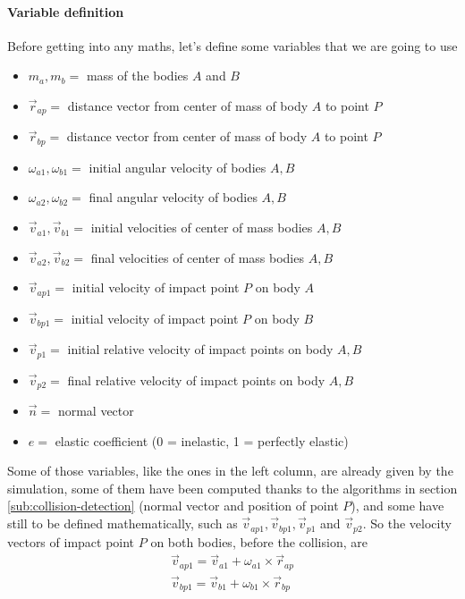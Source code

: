 \paragraph{Variable definition} Before getting into any maths, let's define some
variables that we are going to use

\begin{multicols}{2}
	\begin{itemize}
		\item $m_a, m_b = $ mass of the bodies $A$ and $B$
		\item $\vec r_{ap} = $ distance vector from center of mass of body $A$ to
		      point $P$
		\item $\vec r_{bp} = $ distance vector from center of mass of body $A$ to
		      point $P$
		\item $\omega_{a1}, \omega_{b1} = $ initial angular velocity of bodies
		      $A, B$
		\item $\omega_{a2}, \omega_{b2} = $ final angular velocity of bodies
		      $A, B$
		\item $\vec v_{a1}, \vec v_{b1} =$ initial velocities of center of mass
		      bodies $A, B$
		\item $\vec v_{a2}, \vec v_{b2} =$ final velocities of center of mass
		      bodies $A, B$
		\item $\vec v_{ap1}=$ initial velocity of impact point $P$ on body $A$
		\item $\vec v_{bp1}=$ initial velocity of impact point $P$ on body $B$
		\item $\vec v_{p1}=$ initial relative velocity of impact points on body $A, B$
		\item $\vec v_{p2}=$ final relative velocity of impact points on body $A, B$
		\item $\vec n=$ normal vector
		\item $ e=$ elastic coefficient (0 = inelastic, 1 = perfectly elastic)
	\end{itemize}
\end{multicols}

Some of those variables, like the ones in the left column, are already given by
the simulation, some of them have been computed thanks to the algorithms in
section \ref{sub:collision-detection} (normal vector and position of point $P$),
and some have still to be defined mathematically, such as $\vec v_{ap1},\vec
	v_{bp1},\vec v_{p1}$ and $\vec v_{p2}$. So the velocity vectors of impact
point $P$ on both bodies, before the collision, are
\begin{equation} \label{eq:vabp1}
	\begin{split}
		\vec v_{ap1} = \vec v_{a1} + \omega_{a1} \times \vec r_{ap} \\
		\vec v_{bp1} = \vec v_{b1} + \omega_{b1} \times \vec r_{bp}
	\end{split}
\end{equation}

